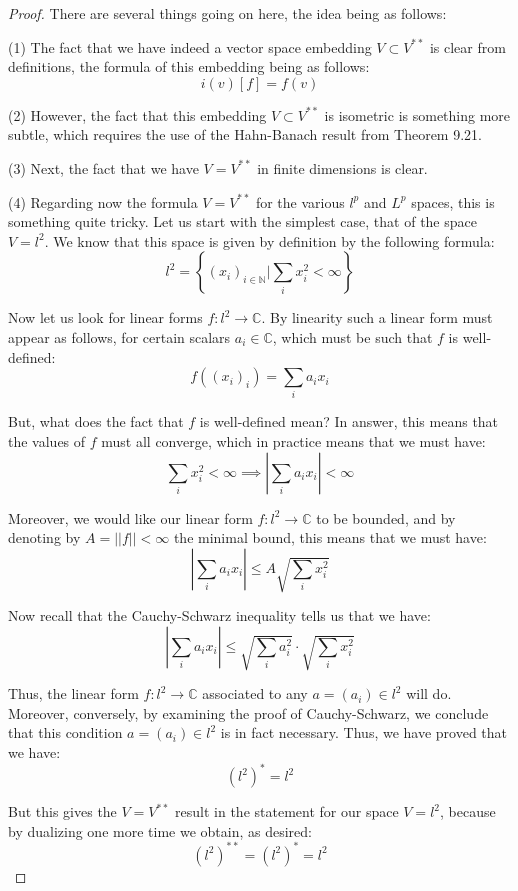 \documentclass[12pt]{amsbook}
\begin{document}
\begin{proof}
There are several things going on here, the idea being as follows:

\medskip

(1) The fact that we have indeed a vector space embedding $V\subset V^{**}$ is clear from definitions, the formula of this embedding being as follows:
$$i(v)[f]=f(v)$$

\medskip

(2) However, the fact that this embedding $V\subset V^{**}$ is isometric is something more subtle, which requires the use of the Hahn-Banach result from Theorem 9.21.

\medskip

(3) Next, the fact that we have $V=V^{**}$ in finite dimensions is clear.

\medskip

(4) Regarding now the formula $V=V^{**}$ for the various $l^p$ and $L^p$ spaces, this is something quite tricky. Let us start with the simplest case, that of the space $V=l^2$. We know that this space is given by definition by the following formula:
$$l^2=\left\{(x_i)_{i\in\mathbb N}\Big|\sum_ix_i^2<\infty\right\}$$

Now let us look for linear forms $f:l^2\to\mathbb C$. By linearity such a linear form must appear as follows, for certain scalars $a_i\in\mathbb C$, which must be such that $f$ is well-defined:
$$f\left((x_i)_i\right)=\sum_ia_ix_i$$

But, what does the fact that $f$ is well-defined mean? In answer, this means that the values of $f$ must all converge, which in practice means that we must have:
$$\sum_ix_i^2<\infty\implies\left|\sum_ia_ix_i\right|<\infty$$

Moreover, we would like our linear form $f:l^2\to\mathbb C$ to be bounded, and by denoting by $A=||f||<\infty$ the minimal bound, this means that we must have:
$$\left|\sum_ia_ix_i\right|\leq A\sqrt{\sum_ix_i^2}$$

Now recall that the Cauchy-Schwarz inequality tells us that we have:
$$\left|\sum_ia_ix_i\right|\leq\sqrt{\sum_ia_i^2}\cdot\sqrt{\sum_ix_i^2}$$

Thus, the linear form $f:l^2\to\mathbb C$ associated to any $a=(a_i)\in l^2$ will do. Moreover, conversely, by examining the proof of Cauchy-Schwarz, we conclude that this condition $a=(a_i)\in l^2$ is in fact necessary. Thus, we have proved that we have:
$$(l^2)^*=l^2$$

But this gives the $V=V^{**}$ result in the statement for our space $V=l^2$, because by dualizing one more time we obtain, as desired:
$$(l^2)^{**}=(l^2)^*=l^2$$


\end{proof}
\end{document}
